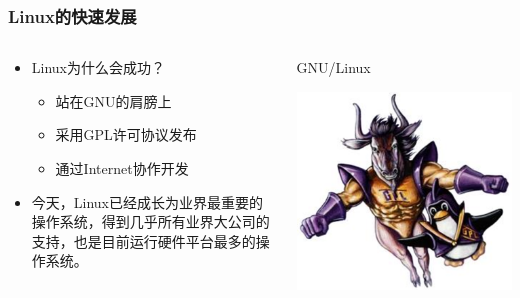 \documentclass[xcolor=svgnames,bigger,presentation]{beamer}
\begin{document}
\begin{frame}
\frametitle{Linux的快速发展}
\label{sec-2-3-2}
\begin{columns}
\begin{column}{0.6\textwidth}
\label{sec-2-3-2-1}
\begin{itemize}

\item Linux为什么会成功？
\label{sec-2-3-2-2}%
\begin{itemize}

\item 站在GNU的肩膀上
\label{sec-2-3-2-2-1}%

\item 采用GPL许可协议发布
\label{sec-2-3-2-2-2}%

\item 通过Internet协作开发
\label{sec-2-3-2-2-3}%
\end{itemize} %

\item 今天，Linux已经成长为业界最重要的操作系统，得到几乎所有业界大公司的支持，也是目前运行硬件平台最多的操作系统。
\label{sec-2-3-2-3}%
\end{itemize} %
\end{column}
\begin{column}{0.4\textwidth}
\begin{exampleblock}{GNU/Linux}
\label{sec-2-3-2-4}

\includegraphics[width=1\textwidth]{img/gnu-linux.jpg}
\end{exampleblock}
\end{column}
\end{columns}
\end{frame}
\end{document}

